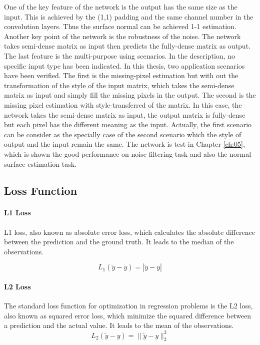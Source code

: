 One of the key feature of the network is the output has the same size as the input. This is achieved by the (1,1) padding and the same channel number in the convolution layers. Thus the surface normal can be achieved 1-1 estimation. Another key point of the network is the robustness of the noise. The network takes semi-dense matrix as input then predicts the fully-dense matrix as output. The last feature is the multi-purpose using scenarios. In the description, no specific input type has been indicated. In this thesis, two application scenarios have been verified. The first is the missing-pixel estimation but with out the transformation of the style of the input matrix, which takes the semi-dense matrix as input and simply fill the missing pixels in the output. The second is the missing pixel estimation with style-transferred of the matrix. In this case, the network takes the semi-dense matrix as input, the output matrix is fully-dense but each pixel has the different meaning as the input. Actually, the first scenario can be consider as the specially case of the second scenario which the style of output and the input remain the same. The network is test in Chapter \ref{ch:05}, which is shown the good performance on noise filtering task and also the normal surface estimation task.

\subsection{Loss Function}

\paragraph{L1 Loss}
L1 loss, also known as absolute error loss, which calculates the absolute difference between the prediction and the ground truth. It leads to the median of the observations.

\[ L_1(\tilde y - y) = |\tilde y - y | \]

\paragraph{L2 Loss}
The standard loss function for optimization in regression problems is the L2 loss, also known as squared error loss, which minimize the squared difference between a prediction and the actual value. It leads to the mean of the observations. 
\[ L_2(\tilde y - y) = \|\tilde y - y \|_2^2 \]


